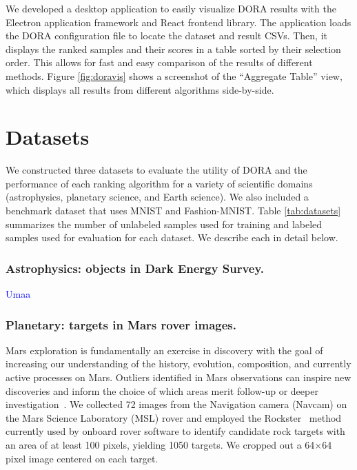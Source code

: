 \documentclass[letterpaper]{article} %
\newcommand{\todo}[1]{\textcolor{blue}{#1}}
\begin{document}
We developed a desktop application to easily visualize DORA results with the
Electron application framework and React frontend library. The application loads
the DORA configuration file to locate the dataset and result CSVs. Then,
it displays the ranked samples and their scores in a table sorted by their
selection order. This allows for fast and easy comparison of the results of
different methods. Figure \ref{fig:doravis} shows a screenshot of the
``Aggregate Table'' view, which displays all results from different algorithms
side-by-side.

\section{Datasets}

We constructed three datasets to evaluate the utility of DORA and the
performance of each ranking algorithm for a variety of scientific domains
 (astrophysics, planetary science, and Earth science). We also included a 
 benchmark dataset that uses MNIST and Fashion-MNIST. Table \ref{tab:datasets}
 summarizes the number of unlabeled samples used for training and labeled
 samples used for evaluation for each dataset. We describe each in detail
 below.

\subsubsection{Astrophysics: objects in Dark Energy Survey.}
\todo{Umaa}

\subsubsection{Planetary: targets in Mars rover images.}
Mars exploration is fundamentally an exercise in discovery with the
goal of increasing our understanding of the history, evolution,
composition, and currently active processes on Mars.  Outliers
identified in Mars observations can inspire new discoveries and inform
the choice of which areas merit follow-up or deeper
investigation~\cite{kerner2020comparison,wagstaff:rover-novelty20}.
We collected \num{72} images from the Navigation camera (Navcam) 
on the Mars Science Laboratory (MSL) rover
and employed the Rockster~\cite{burl:rockster16}
method currently used by onboard rover software to identify candidate rock
targets with an area of at least 100 pixels, yielding \num{1050}
targets.  We cropped out a \num{64}$\times$\num{64} pixel image
centered on each target.
\end{document}
